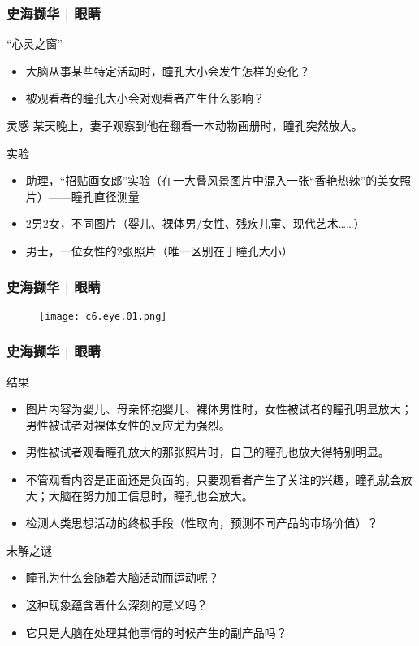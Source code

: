 \begin{frame}
  \frametitle{史海撷华 | 眼睛}
  \begin{block}{“心灵之窗”}
    \begin{itemize}
      \item 大脑从事某些特定活动时，瞳孔大小会发生怎样的变化？
      \item 被观看者的瞳孔大小会对观看者产生什么影响？
    \end{itemize}
  \end{block}
  \pause
  \begin{block}{灵感}
    某天晚上，妻子观察到他在翻看一本动物画册时，瞳孔突然放大。
  \end{block}
  \pause
  \begin{block}{实验}
    \begin{itemize}
      \item 助理，“招贴画女郎”实验（在一大叠风景图片中混入一张“香艳热辣”的美女照片）——瞳孔直径测量
      \item 2男2女，不同图片（婴儿、裸体男/女性、残疾儿童、现代艺术……）
      \item 男士，一位女性的2张照片（唯一区别在于瞳孔大小）
    \end{itemize}
  \end{block}
\end{frame}

\begin{frame}
  \frametitle{史海撷华 | 眼睛}
  \begin{figure}
    \centering
    \texttt{[image: c6.eye.01.png]}
  \end{figure}
\end{frame}

\begin{frame}
  \frametitle{史海撷华 | 眼睛}
  \begin{block}{结果}
    \begin{itemize}
      \item 图片内容为婴儿、母亲怀抱婴儿、裸体男性时，女性被试者的瞳孔明显放大；男性被试者对裸体女性的反应尤为强烈。
      \item 男性被试者观看瞳孔放大的那张照片时，自己的瞳孔也放大得特别明显。
      \item 不管观看内容是正面还是负面的，只要观看者产生了关注的兴趣，瞳孔就会放大；大脑在努力加工信息时，瞳孔也会放大。
      \item 检测人类思想活动的终极手段（性取向，预测不同产品的市场价值）？
    \end{itemize}
  \end{block}
  \pause
  \begin{block}{未解之谜}
    \begin{itemize}
      \item 瞳孔为什么会随着大脑活动而运动呢？
      \item 这种现象蕴含着什么深刻的意义吗？
      \item 它只是大脑在处理其他事情的时候产生的副产品吗？
    \end{itemize}
  \end{block}
\end{frame}

